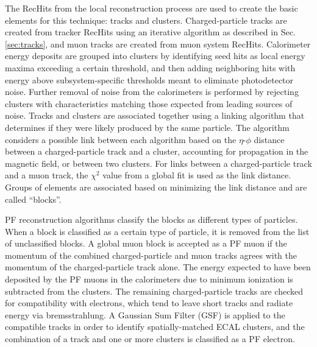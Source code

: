 \documentclass[12pt]{thesis}  %
\begin{document}
The RecHits from the local reconstruction process are used to create the basic elements for this technique: tracks and clusters. Charged-particle tracks are created from tracker RecHits using an iterative algorithm as described in Sec. \ref{sec:tracks}, and muon tracks are created from muon system RecHits. Calorimeter energy deposits are grouped into clusters by identifying seed hits as local energy maxima exceeding a certain threshold, and then adding neighboring hits with energy above subsystem-specific thresholds meant to eliminate photodetector noise. Further removal of noise from the calorimeters is performed by rejecting clusters with characteristics matching those expected from leading sources of noise. Tracks and clusters are associated together using a linking algorithm that determines if they were likely produced by the same particle. The algorithm considers a possible link between each algorithm based on the $\eta$-$\phi$ distance between a charged-particle track and a cluster, accounting for propagation in the magnetic field, or between two clusters. For links between a charged-particle track and a muon track, the $\chi^{2}$ value from a global fit is used as the link distance. Groups of elements are associated based on minimizing the link distance and are called ``blocks''.

PF reconstruction algorithms classify the blocks as different types of particles. When a block is classified as a certain type of particle, it is removed from the list of unclassified blocks. A global muon block is accepted as a PF muon if the momentum of the combined charged-particle and muon tracks agrees with the momentum of the charged-particle track alone. The energy expected to have been deposited by the PF muons in the calorimeters due to minimum ionization is subtracted from the clusters. The remaining charged-particle tracks are checked for compatibility with electrons, which tend to leave short tracks and radiate energy via bremsstrahlung. A Gaussian Sum Filter (GSF) is applied to the compatible tracks in order to identify spatially-matched ECAL clusters, and the combination of a track and one or more clusters is classified as a PF electron.
\end{document}
